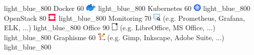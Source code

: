 \documentclass[singlesided,
  paper=a4,
  fontsize=10pt
]{resume}
\begin{document}
{        {}%
        {light_blue_800}
      \skill%
        {Docker}%
        {60}%
        {\includegraphics[height=1em]{skill/docker.png}}%
        {}%
        {light_blue_800}
      \skill%
        {Kubernetes}%
        {60}%
        {\includegraphics[height=1em]{skill/kubernetes.png}}%
        {}%
        {light_blue_800}
      \skill%
        {OpenStack}%
        {80}%
        {\includegraphics[height=1em]{skill/openstack.png}}%
        {}%
        {light_blue_800}
      \skill%
        {Monitoring}%
        {70}%
        {\includegraphics[height=1em]{skill/monitoring.png}}%
        {(e.g. Prometheus, Grafana, ELK, ...)}%
        {light_blue_800}
      \skill%
        {Office}%
        {90}%
        {\includegraphics[height=1em]{skill/office.png}}%
        {(e.g. LibreOffice, MS Office, ...)}%
        {light_blue_800}
      \skill%
        {Graphisme}%
        {60}%
        {\includegraphics[height=1em]{skill/graphism.png}}%
        {(e.g. Gimp, Inkscape, Adobe Suite, ...)}%
        {light_blue_800}
}
\end{document}
